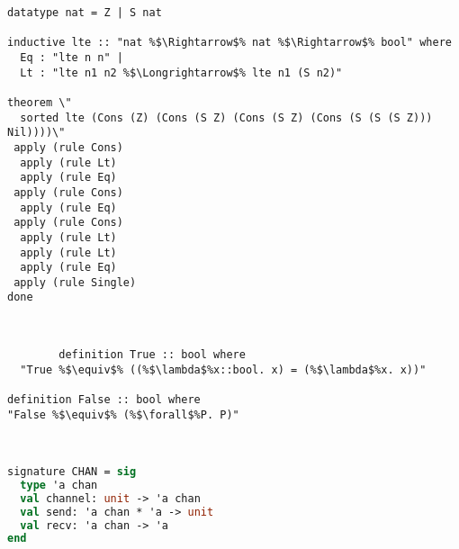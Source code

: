 \documentclass{article}
\begin{document}
      
      \begin{lstlisting}[style=mystyle, escapechar=\%]
        datatype nat = Z | S nat 

inductive lte :: "nat %$\Rightarrow$% nat %$\Rightarrow$% bool" where
  Eq : "lte n n" |
  Lt : "lte n1 n2 %$\Longrightarrow$% lte n1 (S n2)"

theorem \"
  sorted lte (Cons (Z) (Cons (S Z) (Cons (S Z) (Cons (S (S (S Z))) Nil))))\"
 apply (rule Cons)
  apply (rule Lt)
  apply (rule Eq)
 apply (rule Cons)
  apply (rule Eq)
 apply (rule Cons)
  apply (rule Lt)
  apply (rule Lt)
  apply (rule Eq)
 apply (rule Single)
done
\end{lstlisting}

      \begin{lstlisting}[style=mystyle, escapechar=\%]


        definition True :: bool where 
  "True %$\equiv$% ((%$\lambda$%x::bool. x) = (%$\lambda$%x. x))"

definition False :: bool where 
"False %$\equiv$% (%$\forall$%P. P)"


\end{lstlisting}

      \begin{lstlisting}[language=ML, style=mystyle]

signature CHAN = sig
  type 'a chan 
  val channel: unit -> 'a chan
  val send: 'a chan * 'a -> unit
  val recv: 'a chan -> 'a
end       
\end{lstlisting}
\end{document}
